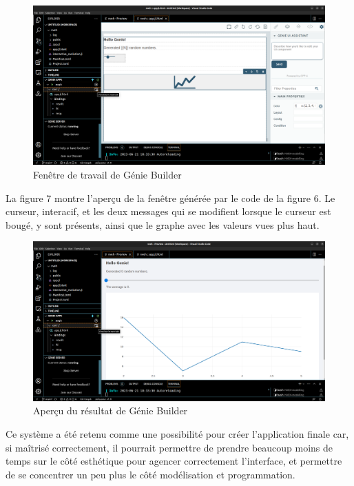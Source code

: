 \documentclass[a4paper, french, 12pt, titlepage]{article}
\begin{document}
\begin{figure}[htb]
  \includegraphics[width=\linewidth]{geniebuilder_travail.png}
  \caption{Fenêtre de travail de Génie Builder}
  \label{fig:organigramme}
\end{figure}

La figure 7 montre l'aperçu de la fenêtre générée par le code de la figure 6. Le curseur, interacif, et les deux messages qui se modifient lorsque le curseur est bougé, y sont présents, ainsi que le graphe avec les valeurs vues plus haut. \\

\begin{figure}[htb]
  \includegraphics[width=\linewidth]{geniebuilder_result.png}
  \caption{Aperçu du résultat de Génie Builder}
  \label{fig:organigramme}
\end{figure}


Ce système a été retenu comme une possibilité pour créer l'application finale car, si maîtrisé correctement, il pourrait permettre de prendre beaucoup moins de temps sur le côté esthétique pour agencer correctement l'interface, et permettre de se concentrer un peu plus le côté modélisation et programmation.  \\
\end{document}
